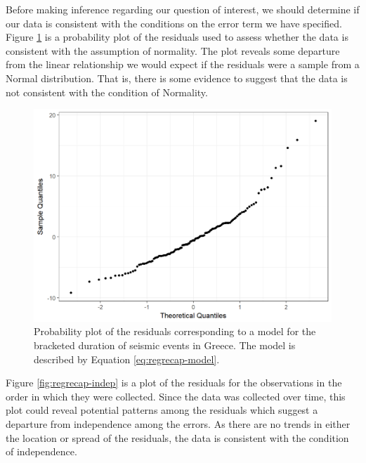 \documentclass[]{book}
\theoremstyle{plain}
\theoremstyle{mydefn}
\theoremstyle{myexmpl}
\theoremstyle{remark}
\begin{document}
Before making inference regarding our question of interest, we should
determine if our data is consistent with the conditions on the error
term we have specified. Figure \ref{fig:regrecap-normality} is a
probability plot of the residuals used to assess whether the data is
consistent with the assumption of normality. The plot reveals some
departure from the linear relationship we would expect if the residuals
were a sample from a Normal distribution. That is, there is some
evidence to suggest that the data is not consistent with the condition
of Normality.





\begin{figure}

{\centering \includegraphics[width=0.8\linewidth]{./Images/regrecap-normality-1} 

}

\caption{Probability plot of the residuals
corresponding to a model for the bracketed duration of seismic events in
Greece. The model is described by Equation \eqref{eq:regrecap-model}.}\label{fig:regrecap-normality}
\end{figure}

Figure \ref{fig:regrecap-indep} is a plot of the residuals for the
observations in the order in which they were collected. Since the data
was collected over time, this plot could reveal potential patterns among
the residuals which suggest a departure from independence among the
errors. As there are no trends in either the location or spread of the
residuals, the data is consistent with the condition of independence.
\end{document}
